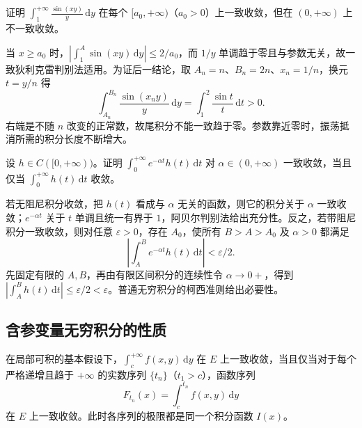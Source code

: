 \begin{example}
\label{ex:parameter-sine-tail-uniformity}
证明 $\displaystyle\int_1^{+\infty}\frac{\sin(xy)}{y}\,\mathrm{d}y$ 在每个 $[a_0,+\infty)$（$a_0>0$）上一致收敛，但在 $(0,+\infty)$ 上不一致收敛。
\end{example}

\begin{solve}
当 $x\geq a_0$ 时，$|\int_1^A\sin(xy)\,\mathrm{d}y|\leq2/a_0$，而 $1/y$ 单调趋于零且与参数无关，故一致狄利克雷判别法适用。为证后一结论，取 $A_n=n$、$B_n=2n$、$x_n=1/n$，换元 $t=y/n$ 得
\[
    \int_{A_n}^{B_n}\frac{\sin(x_ny)}{y}\,\mathrm{d}y
    =\int_1^2\frac{\sin t}{t}\,\mathrm{d}t>0.
\]
右端是不随 $n$ 改变的正常数，故尾积分不能一致趋于零。参数靠近零时，振荡抵消所需的积分长度不断增大。
\end{solve}

\begin{example}
\label{ex:parameter-abel-damping-equivalence}
设 $h\in C([0,+\infty))$。证明 $\int_0^{+\infty}e^{-\alpha t}h(t)\,\mathrm{d}t$ 对 $\alpha\in(0,+\infty)$ 一致收敛，当且仅当 $\int_0^{+\infty}h(t)\,\mathrm{d}t$ 收敛。
\end{example}

\begin{solve}
若无阻尼积分收敛，把 $h(t)$ 看成与 $\alpha$ 无关的函数，则它的积分关于 $\alpha$ 一致收敛；$e^{-\alpha t}$ 关于 $t$ 单调且统一有界于 $1$，阿贝尔判别法给出充分性。反之，若带阻尼积分一致收敛，则对任意 $\varepsilon>0$，存在 $A_0$，使所有 $B>A>A_0$ 及 $\alpha>0$ 都满足
\[
    \left|\int_A^B e^{-\alpha t}h(t)\,\mathrm{d}t\right|<\varepsilon/2.
\]
先固定有限的 $A,B$，再由有限区间积分的连续性令 $\alpha\to0+$，得到 $|\int_A^B h(t)\,\mathrm{d}t|\leq\varepsilon/2<\varepsilon$。普通无穷积分的柯西准则给出必要性。
\end{solve}

\subsection{含参变量无穷积分的性质}
\label{subsec:properties-of-parameter-dependent-infinite-integrals}

\begin{theorem}[连续截断与序列截断的联系]
\label{thm:parameter-infinite-sequential-criterion}
在局部可积的基本假设下，$\int_c^{+\infty}f(x,y)\,\mathrm{d}y$ 在 $E$ 上一致收敛，当且仅当对于每个严格递增且趋于 $+\infty$ 的实数序列 $\{t_n\}$（$t_1>c$），函数序列
\[
    F_{t_n}(x)=\int_c^{t_n}f(x,y)\,\mathrm{d}y
\]
在 $E$ 上一致收敛。此时各序列的极限都是同一个积分函数 $I(x)$。
\end{theorem}


